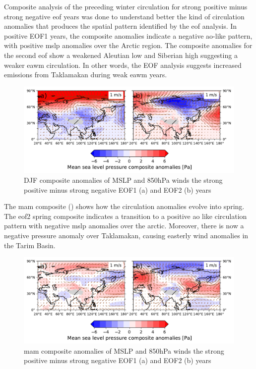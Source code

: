 Composite analysis of the preceding winter circulation for strong positive minus strong negative \acrshort{eof} years was done to understand better the kind of circulation anomalies that produces the spatial pattern identified by the \acrshort{eof} analysis. 
In positive EOF1 years, the composite anomalies indicate a negative \acrshort{ao}-like pattern, with positive \acrshort{mslp} anomalies over the Arctic region.
The composite anomalies for the second \acrshort{eof} show a weakened Aleutian low and Siberian high suggesting a weaker \acrshort{eawm} circulation.
In other words, the EOF analysis suggests increased emissions from Taklamakan during weak \acrshort{eawm} years. 
\begin{figure}[htpb]
    \centering
    \includegraphics[width=\textwidth]{texfiles/figs/EOF_emissions_composite.pdf}
    \caption{DJF composite anomalies of MSLP and 850hPa winds the strong positive minus strong negative  EOF1 (a) and EOF2 (b) years}
    \label{fig:eof_composite_DJF}
\end{figure}
The \acrshort{mam} composite () shows how the circulation anomalies evolve into spring. 
The \acrshort{eof}2 spring composite indicates a transition to a positive \acrshort{ao} like circulation pattern with negative \acrshort{mslp} anomalies over the arctic. 
Moreover, there is now a negative pressure anomaly over Taklamakan, causing easterly wind anomalies in the Tarim Basin.
\begin{figure}[htpb]
    \centering
    \includegraphics[width=\textwidth]{texfiles/figs/EOF_emissions_composite_MAM.pdf}
    \caption{\acrshort{mam} composite anomalies of MSLP and 850hPa winds the strong positive minus strong negative  EOF1 (a) and EOF2 (b) years}
    \label{fig:eof_composite_MAM}
\end{figure}

